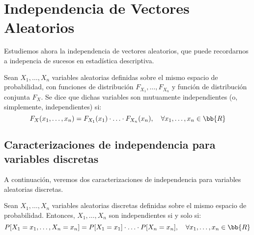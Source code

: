 \chapter{Independencia de Vectores Aleatorios}

Estudiemos ahora la independencia de vectores aleatorios, que puede recordarnos a indepencia de sucesos en estadística descriptiva.
\begin{definicion}
    Sean $X_1, \ldots, X_n$ variables aleatorias definidas sobre el mismo espacio de probabilidad, con funciones de distribución $F_{X_1}, \ldots, F_{X_n}$ y función de distribución conjunta $F_X$. Se dice que dichas variables son mutuamente independientes (o, simplemente, independientes) si:
    \[
        F_X(x_1, \ldots, x_n) = F_{X_1}(x_1) \cdot \ldots \cdot F_{X_n}(x_n), \quad \forall x_1, \ldots, x_n \in \bb{R}
    \]
\end{definicion}


\section{Caracterizaciones de independencia para variables discretas}

A continuación, veremos dos caracterizaciones de independencia para variables aleatorias discretas.
\begin{prop}
    Sean $X_1, \ldots, X_n$ variables aleatorias discretas definidas sobre el mismo espacio de probabilidad. Entonces, $X_1, \ldots, X_n$ son independientes si y solo si:
    \[
        P[X_1 = x_1, \ldots, X_n = x_n] = P[X_1 = x_1] \cdot \ldots \cdot P[X_n = x_n], \quad \forall x_1, \ldots, x_n \in \bb{R}
    \]
\end{prop}

